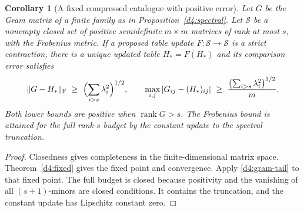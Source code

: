 \documentclass[11pt,reqno]{amsart}
\newtheorem{corollary}[theorem]{Corollary}
\theoremstyle{definition}
\theoremstyle{remark}
\numberwithin{equation}{section}
\begin{document}
\begin{corollary}[A fixed compressed catalogue with positive error]\label{d4:fixed-catalogue}
Let \(G\) be the Gram matrix of a finite family as in
Proposition~\ref{d4:spectral}. Let \(\mathcal S\) be a nonempty
closed set of positive semidefinite \(m\times m\) matrices of rank
at most \(s\), with the Frobenius metric. If a proposed table update
\(F:\mathcal S\to\mathcal S\) is a strict contraction, there is a
unique updated table \(H_*=F(H_*)\) and its comparison error satisfies
\[
 \|G-H_*\|_{\mathrm F}\ \ge\ \Bigl(\sum_{i>s}\lambda_i^2\Bigr)^{1/2},
 \qquad
 \max_{i,j}|G_{ij}-(H_*)_{ij}|
     \ \ge\ \frac{\bigl(\sum_{i>s}\lambda_i^2\bigr)^{1/2}}{m}.
\]
Both lower bounds are positive when \(\operatorname{rank}G>s\).
The Frobenius bound is attained for the full rank-\(s\) budget by
the constant update to the spectral truncation.
\end{corollary}
\begin{proof}
Closedness gives completeness in the finite-dimensional matrix
space. Theorem~\ref{d4:fixed} gives the fixed point and convergence.
Apply \eqref{d4:gram-tail} to that fixed point. The full budget is closed because positivity and the vanishing of all
\((s+1)\)-minors are closed conditions. It contains the truncation,
and the constant update has Lipschitz constant zero.
\end{proof}
\end{document}
